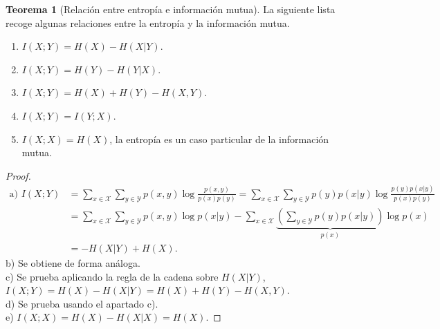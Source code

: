 \documentclass[10pt,a4paper]{article} %
\theoremstyle{definition}
\newtheorem{theorem}{Teorema}[section]
\begin{document}
\begin{theorem}[Relación entre entropía e información mutua]\label{t:ent_im}
  La siguiente lista recoge algunas relaciones entre la entropía y la información mutua.
\begin{enumerate}[label={\alph*)}]
  \item $I(X;Y) = H(X) - H(X|Y)$.
  \item $I(X;Y) = H(Y) - H(Y|X)$.
  \item $I(X;Y) = H(X) + H(Y) - H(X,Y)$.
  \item $I(X;Y) = I(Y;X)$.
  \item $I(X;X) = H(X)$, la entropía es un caso particular de la información mutua.
  \end{enumerate}
\end{theorem}
\begin{proof}
   
  \begin{align*}
    \text{a) }I(X;Y) &= \sum_{x \in \mathcal{X}}\sum_{y \in \mathcal{Y}}p(x,y) \log \frac{p(x,y)}{p(x)p(y)} = \sum_{x \in \mathcal{X}}\sum_{y \in \mathcal{Y}} p(y) p(x|y) \log \frac{p(y)p(x|y)}{p(x)p(y)}\\
    &= \sum_{x \in \mathcal{X}}\sum_{y \in \mathcal{Y}} p(x,y) \log p(x|y) - \sum_{x \in \mathcal{X}}\underbrace{\left ( \sum_{y \in \mathcal{Y}} p(y) p(x|y) \right)}_{p(x)} \log p(x)\\
    &= - H(X|Y) + H(X).
  \end{align*}
  b) Se obtiene de forma análoga.\\
  c) Se prueba aplicando la regla de la cadena sobre $H(X|Y)$, $I(X;Y) = H(X) - H(X|Y) = H(X) + H(Y) - H(X,Y)$.\\
  d) Se prueba usando el apartado c).\\
  e) $I(X;X) = H(X) - H(X|X) = H(X)$.
\end{proof}
\end{document}
